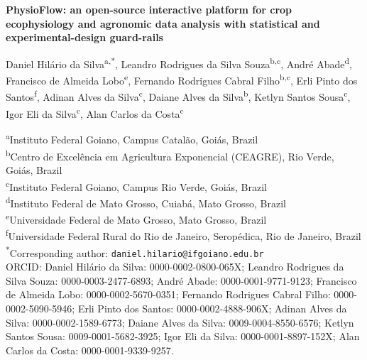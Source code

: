 \documentclass[11pt, letterpaper]{article}
\begin{document}
\begin{center}
{\LARGE\bfseries PhysioFlow: an open-source interactive platform for crop ecophysiology and agronomic data analysis with statistical and experimental-design guard-rails}
\end{center}

\noindent
Daniel Hil\'ario da Silva\textsuperscript{a,*}, Leandro Rodrigues da Silva Souza\textsuperscript{b,c}, Andr\'e Abade\textsuperscript{d}, Francisco de Almeida Lobo\textsuperscript{e}, Fernando Rodrigues Cabral Filho\textsuperscript{b,c}, Erli Pinto dos Santos\textsuperscript{f}, Adinan Alves da Silva\textsuperscript{c}, Daiane Alves da Silva\textsuperscript{b}, Ketlyn Santos Sousa\textsuperscript{c}, Igor Eli da Silva\textsuperscript{c}, Alan Carlos da Costa\textsuperscript{c}

\vspace{0.4em}
\noindent
{\footnotesize
\textsuperscript{a}Instituto Federal Goiano, Campus Catal\~ao, Goi\'as, Brazil\\
\textsuperscript{b}Centro de Excel\^encia em Agricultura Exponencial (CEAGRE), Rio Verde, Goi\'as, Brazil\\
\textsuperscript{c}Instituto Federal Goiano, Campus Rio Verde, Goi\'as, Brazil\\
\textsuperscript{d}Instituto Federal de Mato Grosso, Cuiab\'a, Mato Grosso, Brazil\\
\textsuperscript{e}Universidade Federal de Mato Grosso, Mato Grosso, Brazil\\
\textsuperscript{f}Universidade Federal Rural do Rio de Janeiro, Serop\'edica, Rio de Janeiro, Brazil\\[0.3em]
\textsuperscript{*}Corresponding author: \texttt{daniel.hilario@ifgoiano.edu.br}\\[0.3em]
ORCID: Daniel Hil\'ario da Silva: 0000-0002-0800-065X; Leandro Rodrigues da Silva Souza: 0000-0003-2477-6893; Andr\'e Abade: 0000-0001-9771-9123; Francisco de Almeida Lobo: 0000-0002-5670-0351; Fernando Rodrigues Cabral Filho: 0000-0002-5090-5946; Erli Pinto dos Santos: 0000-0002-4888-906X; Adinan Alves da Silva: 0000-0002-1589-6773; Daiane Alves da Silva: 0009-0004-8550-6576; Ketlyn Santos Sousa: 0009-0001-5682-3925; Igor Eli da Silva: 0000-0001-8897-152X; Alan Carlos da Costa: 0000-0001-9339-9257.
}
\end{document}
